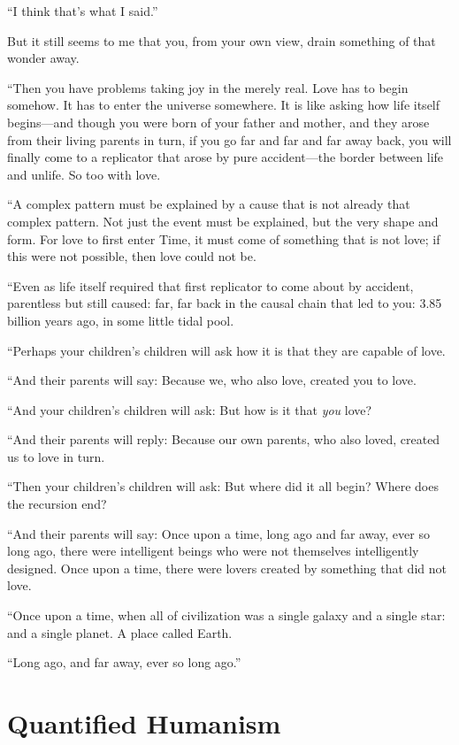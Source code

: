 {
 ``I think that's what I
said.''}

{
 But it still seems to me that you, from your own view, drain
something of that wonder away.}

{
 ``Then you have problems taking joy in the merely
real. Love has to begin somehow. It has to enter the universe
somewhere. It is like asking how life itself begins---and though you
were born of your father and mother, and they arose from their living
parents in turn, if you go far and far and far away back, you will
finally come to a replicator that arose by pure accident---the border
between life and unlife. So too with love.}

{
 ``A complex pattern must be explained by a cause
that is not already that complex pattern. Not just the event must be
explained, but the very shape and form. For love to first enter Time,
it must come of something that is not love; if this were not possible,
then love could not be.}

{
 ``Even as life itself required that first
replicator to come about by accident, parentless but still caused: far,
far back in the causal chain that led to you: 3.85 billion years ago,
in some little tidal pool.}

{
 ``Perhaps your children's
children will ask how it is that they are capable of love.}

{
 ``And their parents will say: Because we, who
also love, created you to love.}

{
 ``And your children's children
will ask: But how is it that \textit{you} love?}

{
 ``And their parents will reply: Because our own
parents, who also loved, created us to love in turn.}

{
 ``Then your children's children
will ask: But where did it all begin? Where does the recursion end?}

{
 ``And their parents will say: Once upon a time,
long ago and far away, ever so long ago, there were intelligent beings
who were not themselves intelligently designed. Once upon a time, there
were lovers created by something that did not love.}

{
 ``Once upon a time, when all of civilization was
a single galaxy and a single star: and a single planet. A place called
Earth.}

{
 ``Long ago, and far away, ever so long
ago.''}

\myendsectiontext

\chapter{Quantified Humanism}


